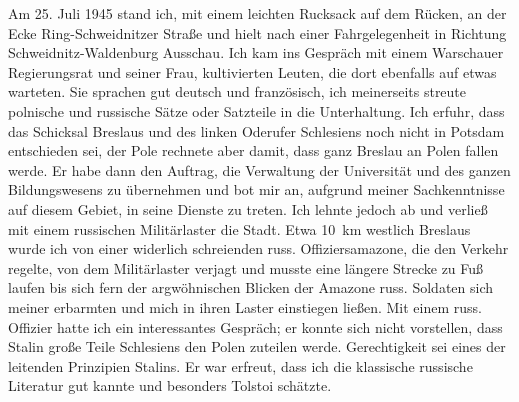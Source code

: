 \documentclass[a5paper,pagesize,10pt,twoside=true]{scrbook}
\renewcommand{\marginpar}[2][]{}
\begin{document}
Am 25. Juli 1945 stand ich, mit einem leichten Rucksack auf dem Rücken, an der Ecke Ring-Schweidnitzer Straße und hielt nach einer Fahrgelegenheit in Richtung Schweidnitz-Waldenburg Ausschau. Ich kam ins Gespräch mit einem Warschauer Regierungsrat und seiner Frau, kultivierten Leuten, die dort ebenfalls auf etwas warteten. Sie sprachen gut deutsch und französisch, ich meinerseits streute polnische und russische Sätze oder Satzteile in die Unterhaltung. Ich erfuhr, dass das Schicksal Breslaus und des linken Oderufer Schlesiens noch nicht in Potsdam entschieden sei, der Pole rechnete aber damit, dass ganz Breslau an Polen fallen werde. Er habe dann den Auftrag, die Verwaltung der Universität und des ganzen Bildungswesens zu übernehmen und bot mir an, aufgrund meiner Sachkenntnisse auf diesem Gebiet, in seine Dienste zu treten. Ich lehnte jedoch ab und verließ mit einem russischen Militärlaster die Stadt. Etwa 10~km westlich Breslaus wurde ich von einer widerlich schreienden russ. Offiziersamazone, die den Verkehr regelte, von dem Militärlaster verjagt und musste \marginpar{102} eine längere Strecke zu Fuß laufen bis sich fern der argwöhnischen Blicken der Amazone russ. Soldaten sich meiner erbarmten und mich in ihren Laster einstiegen ließen. Mit einem russ. Offizier hatte ich ein interessantes Gespräch; er konnte sich nicht vorstellen, dass Stalin große Teile Schlesiens den Polen zuteilen werde. Gerechtigkeit sei eines der leitenden Prinzipien Stalins. Er war erfreut, dass ich die klassische russische Literatur gut kannte und besonders Tolstoi schätzte.
\end{document}
